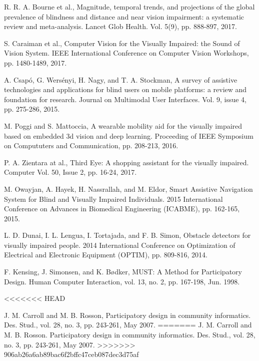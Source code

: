 \documentclass[10pt,conference,compsocconf]{IEEEtran}
\begin{document}
\begin{thebibliography}{99}

 R. R. A. Bourne et al., Magnitude, temporal trends, and projections of the global prevalence of blindness and distance and near vision impairment: a systematic review and meta-analysis. Lancet Glob Health. Vol. 5(9), pp. 888-897, 2017.


 S. Caraiman et al., Computer Vision for the Visually Impaired: the Sound of Vision System. IEEE International Conference on Computer Vision Workshops, pp. 1480-1489, 2017.

 A. Csap\'{o}, G. Wers\'{e}nyi, H. Nagy, and T. A. Stockman, A survey of assistive technologies and applications for blind users on mobile platforms: a review and foundation for research. Journal on Multimodal User Interfaces. Vol. 9, issue 4,  pp. 275-286, 2015.


 M. Poggi and S. Mattoccia, A wearable mobility aid for the visually impaired based on embedded 3d vision and deep learning. Proceeding of IEEE Symposium on Compututers and Communication, pp. 208-213, 2016.

 P. A. Zientara at al., Third Eye: A shopping assistant for the visually impaired. Computer Vol. 50, Issue 2, pp. 16-24, 2017.


 M. Owayjan, A. Hayek, H. Nassrallah, and M. Eldor, Smart Assistive Navigation System for Blind and Visually Impaired Individuals. 2015 International Conference on Advances in Biomedical Engineering (ICABME), pp. 162-165, 2015.


 L. D. Dunai, I. L. Lengua, I. Tortajada, and F. B. Simon, Obstacle detectors for visually impaired people. 2014 International Conference on Optimization of Electrical and Electronic Equipment (OPTIM),  pp. 809-816, 2014.

 F. Kensing, J. Simonsen, and K. B\o dker, MUST: A Method for Participatory Design. Human Computer Interaction, vol. 13, no. 2, pp. 167-198, Jun. 1998.


<<<<<<< HEAD


 J. M. Carroll and M. B. Rosson, Participatory design in community informatics. Des. Stud., vol. 28, no. 3, pp. 243-261, May 2007.
=======
 J. M. Carroll and M. B. Rosson. Participatory design in community informatics. Des. Stud., vol. 28, no. 3, pp. 243-261, May 2007.
>>>>>>> 906ab26a6ab89bac6f2bffc47ceb087dec3d75af


\end{thebibliography}
\end{document}
